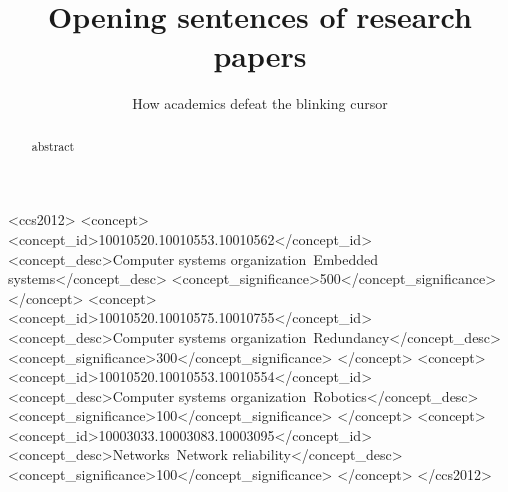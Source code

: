 \documentclass[sigconf]{acmart}
\begin{document}
	
	\title{Opening sentences of research papers	}
	\subtitle{	How academics defeat the blinking cursor }
	
	
	
	
	\begin{abstract}
		abstract
	\end{abstract}
	
	\begin{CCSXML}
		<ccs2012>
		<concept>
		<concept_id>10010520.10010553.10010562</concept_id>
		<concept_desc>Computer systems organization~Embedded systems</concept_desc>
		<concept_significance>500</concept_significance>
		</concept>
		<concept>
		<concept_id>10010520.10010575.10010755</concept_id>
		<concept_desc>Computer systems organization~Redundancy</concept_desc>
		<concept_significance>300</concept_significance>
		</concept>
		<concept>
		<concept_id>10010520.10010553.10010554</concept_id>
		<concept_desc>Computer systems organization~Robotics</concept_desc>
		<concept_significance>100</concept_significance>
		</concept>
		<concept>
		<concept_id>10003033.10003083.10003095</concept_id>
		<concept_desc>Networks~Network reliability</concept_desc>
		<concept_significance>100</concept_significance>
		</concept>
		</ccs2012>
	\end{CCSXML}
	
	
	
\end{document}

